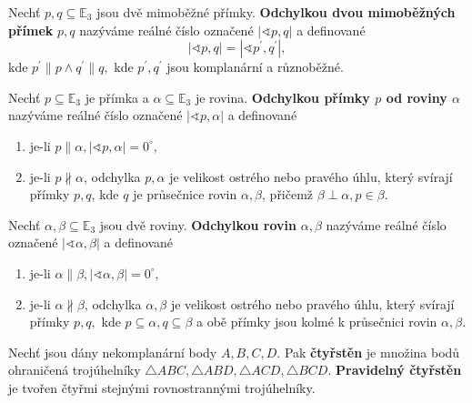 \begin{definition}
    Nechť $p,q\subseteq \mathbb E_3$ jsou dvě mimoběžné přímky. \textbf{Odchylkou
    dvou mimoběžných přímek} $p,q$ nazýváme reálné číslo označené $|\sphericalangle
    p,q|$ a definované
    $$|\sphericalangle p,q| = |\sphericalangle p^\prime, q^\prime|,$$
    kde $p^\prime \parallel p \land q^\prime \parallel q,$ kde $p^\prime, q^\prime$
    jsou komplanární a různoběžné.
\end{definition}

\begin{definition}
    Nechť $p\subseteq \mathbb E_3$ je přímka a $\alpha\subseteq \mathbb E_3$ je
    rovina. \textbf{Odchylkou přímky $p$ od roviny $\alpha$} nazýváme
    reálné číslo označené $|\sphericalangle
    p,\alpha|$ a definované
    \begin{enumerate}[$i.$]
    \item je-li $p\parallel \alpha, |\sphericalangle p,\alpha|=0^\circ,$
    \item je-li $p\nparallel \alpha$, odchylka $p,\alpha$ je velikost ostrého nebo
        pravého úhlu,
        který svírají přímky $p,q$, kde $q$ je průsečnice rovin $\alpha, \beta$,
        přičemž $\beta \perp \alpha, p\in\beta.$
    \end{enumerate}
\end{definition}

\begin{definition}
    Nechť $\alpha,\beta\subseteq \mathbb E_3$ jsou dvě roviny. \textbf{Odchylkou
    rovin} $\alpha, \beta$ nazýváme reálné číslo označené $|\sphericalangle
    \alpha, \beta|$ a definované
    \begin{enumerate}[$i.$]
    \item je-li $\alpha\parallel \beta, |\sphericalangle \alpha,\beta|=0^\circ,$
   	\item je-li $\alpha\nparallel \beta$, odchylka $\alpha,\beta$ je velikost
        ostrého nebo pravého úhlu,
        který svírají přímky $p,q,$ kde $p\subseteq \alpha, q\subseteq \beta$ a obě
        přímky jsou kolmé k průsečnici rovin $\alpha, \beta.$
    \end{enumerate}
\end{definition}

\begin{definition}
    Nechť jsou dány nekomplanární body $A,B,C,D.$ Pak
  \textbf{čtyřstěn} je množina bodů ohraničená trojúhelníky $\triangle ABC, \triangle
  ABD, \triangle ACD, \triangle BCD.$
  \textbf{Pravidelný čtyřstěn} je tvořen čtyřmi stejnými rovnostrannými trojúhelníky.
\end{definition}

